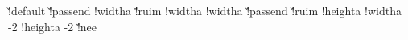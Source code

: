 {     \boxhasstrutfalse
     \boxisoverlaidtrue
     \@@localoffset\zeropoint
   \else
     \boxhasoffsettrue
     \boxhasstruttrue
     \boxisoverlaidfalse
     \ifx\localoffset\v!default %
       \let\localoffset\defaultframeoffset
     \else
       \let{}\localoffset
     \fi
     \@@localoffset\localoffset
     \advance\@@localoffset {}
   \fi\fi
   \ifx\localwidth\v!passend
     \ifboxhasformat
       \boxhaswidthtrue
       \!!widtha\hsize
     \else
       \boxhaswidthfalse
     \fi
   \else\ifx\localwidth\v!ruim
     \boxhaswidthtrue
     \!!widtha\hsize
   \else
     \boxhaswidthtrue
     \!!widtha\localwidth
   \fi\fi
   \ifx\localheight\v!passend
     \boxhasheightfalse %
   \else\ifx\localheight\v!ruim
     \boxhasheightfalse
   \else
     \boxhasheighttrue
     \!!heighta\localheight
   \fi\fi
   \ifdim\!!widtha=\hsize
     \parindent\zeropoint
     \setlocalhsize
     \!!widtha\localhsize
   \fi
   \advance\!!widtha  -2\@@localoffset
   \advance\!!heighta -2\@@localoffset
   \ifx\localstrut\v!nee
     \boxhasstrutfalse
   \fi
   \ifboxhasstrut
     \setstrut
     \let\localbegstrut\begstrut
     \let\localendstrut\endstrut
     \let\localstrut   \strut
   \else
     \let\localbegstrut\pseudobegstrut %
     \let\localendstrut\pseudoendstrut %
     \let\localstrut   \pseudostrut    %
   \fi
   \ifboxhasheight
     \let\\\vboxednewline
     \ifboxhaswidth
       \let\hairline\vboxedhairline
       \ifboxhasformat
         \let\next\doformatboxSomeFormat
       \else
         \let\next\doformatboxNoFormat
       \fi
     \else
       \let\hairline\hboxedhairline
       \ifboxhasformat
         \let\next\doformatboxHeight
       \else
         \let\next\doformatboxVSize
       \fi
     \fi
   \else
     \ifboxhaswidth
       \ifboxhasformat
         \let\hairline\vboxedhairline
         \let\\\vboxednewline
         \let\next\doformatboxWidth
       \else
         \let\hairline\hboxedhairline
         \let\\\hboxednewline
         \let\next\doformatboxHSize
       \fi
     \else
       \let\hairline\hboxedhairline
       \let\\\hboxednewline
}
